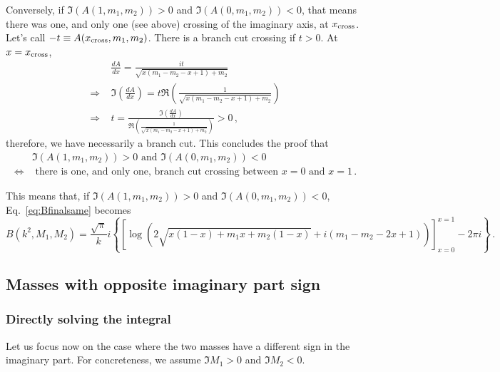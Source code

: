 \documentclass[twoside]{article}
\begin{document}
Conversely, if $\Im(A(1,m_1,m_2)) > 0$ and $\Im(A(0,m_1,m_2)) < 0$, that means there was one, and only one (see above) crossing of the imaginary axis, at $x_{\rm cross}$. Let's call $-t \equiv A(x_{\rm cross},m_1,m_2)$. There is a branch cut crossing if $t>0$. At $x=x_{\rm cross}$,
\begin{equation}
\begin{split}
&\frac{dA}{dx} = \frac{i t}{\sqrt{x (m_1-m_2-x+1)+m_2}}\\
\Rightarrow\; & \Im\left(\frac{dA}{dx}\right) = t \Re\left(\frac{1}{\sqrt{x (m_1-m_2-x+1)+m_2}} \right) \\
\Rightarrow\; & t = \frac{\Im\left(\frac{dA}{dx}\right)}{\Re\left(\frac{1}{\sqrt{x (m_1-m_2-x+1)+m_2}} \right)} >0\,,
\end{split}
\end{equation}
therefore, we have necessarily a branch cut.
This concludes the proof that 
\begin{equation}
\begin{split}
&\Im(A(1,m_1,m_2)) > 0 \text{ and } \Im(A(0,m_1,m_2)) < 0 \\
\Leftrightarrow & \text{ there is one, and only one, branch cut crossing between }x=0 \text{ and }x=1\,.
\end{split}
\end{equation}

This means that, if $\Im(A(1,m_1,m_2)) > 0$ and $\Im(A(0,m_1,m_2)) < 0$, Eq.~\eqref{eq:Bfinalsame} becomes
\begin{equation}
\label{eq:Bfinalsamecut}
B(k^2,M_1,M_2) =\frac{\sqrt{\pi}}{k} i\left\{\left[\log \left(2 \sqrt{x (1-x) + m_1 x + m_2 (1-x)}+i (m_1-m_2-2 x+1)\right)\right]_{x=0}^{x=1}-2\pi i \right\}\,.
\end{equation}


\subsection{Masses with opposite imaginary part sign}

\subsubsection{Directly solving the integral}

Let us focus now on the case where the two masses have a different sign in the imaginary part. For concreteness, we assume $\Im M_1 > 0$ and $\Im M_2 < 0$.
\end{document}
